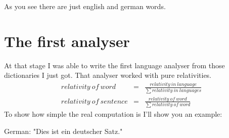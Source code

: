 As you see there are just english and german words.

\section{The first analyser}
At that stage I was able to write the first language analyser from those dictionaries I just got. That analyser worked with pure relativities. 
\begin{eqnarray}
{relativity\ of\ word} 		&=	&\frac{relativity\ in\ language}{\sum relativity\ in\ languages}				\nonumber \\
{relativity\ of\ sentence} 	&=	&\frac{relativity\ of\ word}{\sum relativity\ of\ word}						\nonumber
\end{eqnarray}
 To show how simple the real computation is I'll show you an example:

German: "Dies ist ein deutscher Satz."

